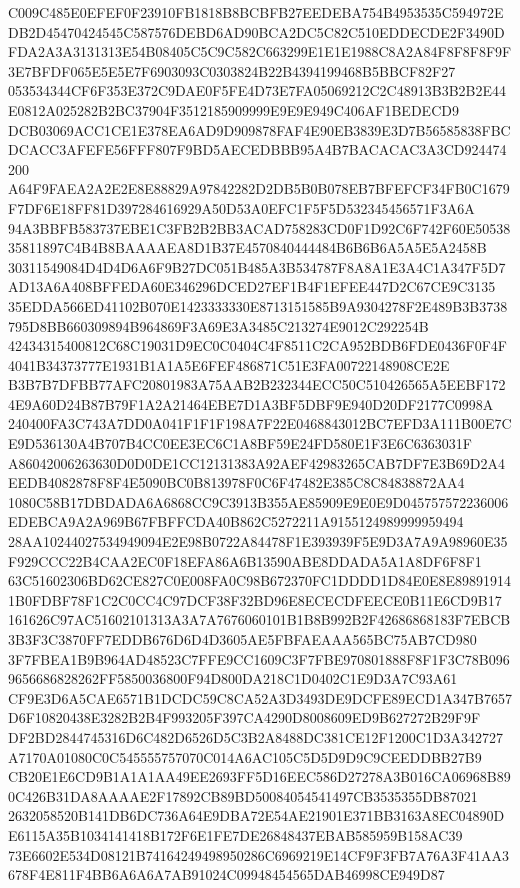 \documentclass[UTF8,fontset=fandol,zihao=-4,a4paper]{ctexart}
\begin{document}
{{C009C485E0EFEF0F23910FB1818B8BCBFB27EEDEBA754B4953535C594972EDB2D45470424545C587576DEBD6AD90BCA2DC5C82C510EDDECDE2F3490D
FDA2A3A3131313E54B08405C5C9C582C663299E1E1E1988C8A2A84F8F8F8F9F3E7BFDF065E5E5E7F6903093C0303824B22B4394199468B5BBCF82F27
053534344CF6F353E372C9DAE0F5FE4D73E7FA05069212C2C48913B3B2B2E44E0812A025282B2BC37904F3512185909999E9E9E949C406AF1BEDECD9
DCB03069ACC1CE1E378EA6AD9D909878FAF4E90EB3839E3D7B56585838FBCDCACC3AFEFE56FFF807F9BD5AECEDBBB95A4B7BACACAC3A3CD924474200
A64F9FAEA2A2E2E8E88829A97842282D2DB5B0B078EB7BFEFCF34FB0C1679F7DF6E18FF81D397284616929A50D53A0EFC1F5F5D532345456571F3A6A
94A3BBFB583737EBE1C3FB2B2BB3ACAD758283CD0F1D92C6F742F60E5053835811897C4B4B8BAAAAEA8D1B37E4570840444484B6B6B6A5A5E5A2458B
30311549084D4D4D6A6F9B27DC051B485A3B534787F8A8A1E3A4C1A347F5D7AD13A6A408BFFEDA60E346296DCED27EF1B4F1EFEE447D2C67CE9C3135
35EDDA566ED41102B070E1423333330E8713151585B9A9304278F2E489B3B3738795D8BB660309894B964869F3A69E3A3485C213274E9012C292254B
42434315400812C68C19031D9EC0C0404C4F8511C2CA952BDB6FDE0436F0F4F4041B34373777E1931B1A1A5E6FEF486871C51E3FA00722148908CE2E
B3B7B7DFBB77AFC20801983A75AAB2B232344ECC50C510426565A5EEBF1724E9A60D24B87B79F1A2A21464EBE7D1A3BF5DBF9E940D20DF2177C0998A
240400FA3C743A7DD0A041F1F1F198A7F22E0468843012BC7EFD3A111B00E7CE9D536130A4B707B4CC0EE3EC6C1A8BF59E24FD580E1F3E6C6363031F
A86042006263630D0D0DE1CC12131383A92AEF42983265CAB7DF7E3B69D2A4EEDB4082878F8F4E5090BC0B813978F0C6F47482E385C8C84838872AA4
1080C58B17DBDADA6A6868CC9C3913B355AE85909E9E0E9D045757572236006EDEBCA9A2A969B67FBFFCDA40B862C5272211A9155124989999959494
28AA10244027534949094E2E98B0722A84478F1E393939F5E9D3A7A9A98960E35F929CCC22B4CAA2EC0F18EFA86A6B13590ABE8DDADA5A1A8DF6F8F1
63C51602306BD62CE827C0E008FA0C98B672370FC1DDDD1D84E0E8E898919141B0FDBF78F1C2C0CC4C97DCF38F32BD96E8ECECDFEECE0B11E6CD9B17
161626C97AC51602101313A3A7A7676060101B1B8B992B2F42686868183F7EBCB3B3F3C3870FF7EDDB676D6D4D3605AE5FBFAEAAA565BC75AB7CD980
3F7FBEA1B9B964AD48523C7FFE9CC1609C3F7FBE970801888F8F1F3C78B0969656686828262FF5850036800F94D800DA218C1D0402C1E9D3A7C93A61
CF9E3D6A5CAE6571B1DCDC59C8CA52A3D3493DE9DCFE89ECD1A347B7657D6F10820438E3282B2B4F993205F397CA4290D8008609ED9B627272B29F9F
DF2BD2844745316D6C482D6526D5C3B2A8488DC381CE12F1200C1D3A342727A7170A01080C0C545555757070C014A6AC105C5D5D9D9C9CEEDDBB27B9
CB20E1E6CD9B1A1A1AA49EE2693FF5D16EEC586D27278A3B016CA06968B890C426B31DA8AAAAE2F17892CB89BD50084054541497CB3535355DB87021
2632058520B141DB6DC736A64E9DBA72E54AE21901E371BB3163A8EC04890DE6115A35B1034141418B172F6E1FE7DE26848437EBAB585959B158AC39
73E6602E534D08121B74164249498950286C6969219E14CF9F3FB7A76A3F41AA3678F4E811F4BB6A6A6A7AB91024C09948454565DAB46998CE949D87
}}
\end{document}
